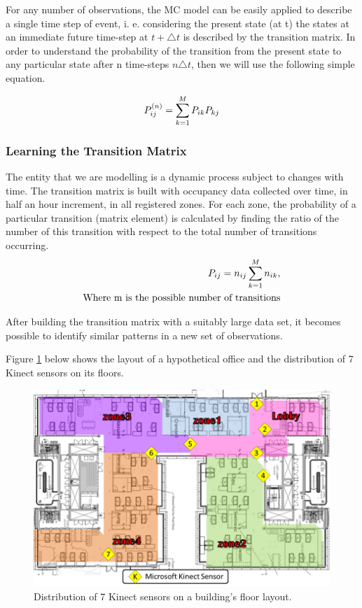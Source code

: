 For any number of observations, the MC model can be easily applied to describe a single time step of event, i. e.  considering the present state (at t) the states at an immediate future time-step at ${t  + \triangle t}$  is described by the transition matrix.   In order to understand the probability of the transition from the present state to any particular state after n time-steps ${n \triangle t}$, then  we will use the following simple equation.

\begin{equation}
 \centering
\label{equ:4}
P_{ij}^{(n)} = \sum_{k=1}^{M} P_{ik} P_{kj}
\end{equation}

\subsubsection{Learning the Transition Matrix}
The entity that we are modelling is a dynamic process subject to changes with time. The transition matrix is built with occupancy data collected over time, in half an hour increment, in all registered zones.  For each zone, the probability of a particular transition (matrix element) is calculated by finding the ratio of the number of this transition with respect to the total number of transitions occurring.
\begin{equation}
 \centering
\begin{split}
\label{equ:5}
P_{ij} = n_{ij} \/ \sum_{k=1}^{M}  n_{ik} ,  \\
\text{Where m is the possible number of transitions}
\end{split}
\end{equation}


After building the transition matrix with a suitably large data set, it becomes possible to identify similar patterns in a new set of observations.

 Figure \ref{fig:occupflow} below shows the layout of a hypothetical office and the distribution of 7 Kinect sensors on its floors.
\begin{figure}[!ht]
  \centering
 	  	\includegraphics[width=0.9\columnwidth]{./images/numberofkinect.png}
  \caption{Distribution of 7 Kinect sensors on a building's floor layout.}\label{fig:occupflow}
\end{figure}

